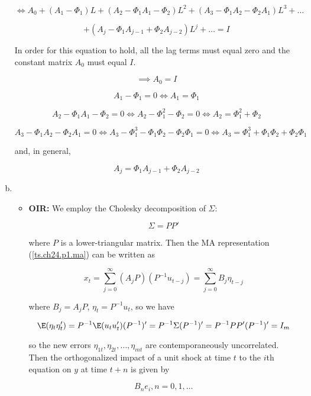 \begin{enumerate}[(a)]
\[
\iff A_0 +( A_1  - \Phi_1) L + (A_2  - \Phi_1 A_1 - \Phi_2)  L^2 + (A_3  - \Phi_1 A_2 - \Phi_2 A_1)L^3 + \ldots 
\]

\[
+ (A_j - \Phi_1 A_{j-1} + \Phi_2 A_{j-2})L^j + \ldots = I
\]

In order for this equation to hold, all the lag terms must equal zero and the constant matrix \(A_0\) must equal \(I\).

\[
\implies \boxed{A_0 = I}
\]

\[
A_1 - \Phi_1 = 0 \iff \boxed{A_1 = \Phi_1}
\]

\[
A_2 -\Phi_1 A_1 - \Phi_2 = 0 \iff A_2 - \Phi_1^2 - \Phi_2 = 0 \iff  \boxed{A_2 = \Phi_1^2 + \Phi_2}
\]

\[
A_3  - \Phi_1 A_2 - \Phi_2 A_1 = 0 \iff A_3 - \Phi_1^3 - \Phi_1 \Phi_2 - \Phi_2 \Phi_1 = 0 \iff \boxed{A_3 = \Phi_1^3 + \Phi_1 \Phi_2 + \Phi_2 \Phi_1}
\]

and, in general,

\[
\boxed{
A_j = \Phi_1 A_{j-1} + \Phi_2 A_{j-2}}
\]

\item

\begin{itemize}

 \item \textbf{OIR:} We employ the Cholesky decomposition of \(\Sigma\):

\begin{equation}\label{ts.eqn.24.5}
\Sigma = P P'
\end{equation}

where \(P\) is a lower-triangular matrix. Then the MA representation (\ref{ts.ch24.p1.ma}) can be written as

\begin{equation}\label{ts.eqn.24.6}
x_t = \sum_{j=0}^\infty (A_j P)(P^{-1}u_{t-j}) = \sum_{j=0}^\infty B_j \eta_{t-j}
\end{equation}

where \(B_j = A_jP\), \(\eta_t = P^{-1}u_t\), so we have

\[
\E(\eta_t \eta_t') = P^{-1} \E(u_t u_t') (P^{-1})' = P^{-1} \Sigma  (P^{-1})'  = P^{-1}P P'  (P^{-1})' = I_m
\]

so the new errors \(\eta_{1t}, \eta_{2t}, \ldots, \eta_{mt}\) are contemporaneously uncorrelated. Then the orthogonalized impact of a unit shock at time \(t\) to the \(i\)th equation on \(y\) at time \(t + n\) is given by

\begin{equation}\label{ts.eqn.24.7}
B_n e_i, n = 0, 1, \ldots
\end{equation}


\end{itemize}
\end{enumerate}

